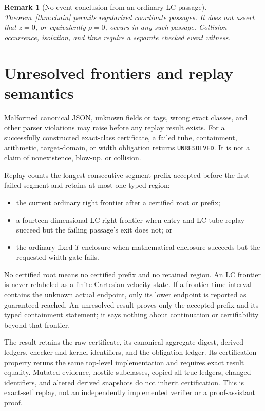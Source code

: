 \documentclass[11pt]{article}
\newtheorem{remark}[theorem]{Remark}
\begin{document}
\begin{remark}[No event conclusion from an ordinary LC passage]
Theorem~\ref{thm:chain} permits regularized coordinate passages.  It does not
assert that $z=0$, or equivalently $\rho=0$, occurs in any such passage.
Collision occurrence, isolation, and time require a separate checked event
witness.
\end{remark}

\section{Unresolved frontiers and replay semantics}
\label{sec:unresolved}

Malformed canonical JSON, unknown fields or tags, wrong exact classes, and
other parser violations may raise before any replay result exists.  For a
successfully constructed exact-class certificate, a failed tube,
containment, arithmetic, target-domain, or width obligation returns
\texttt{UNRESOLVED}.  It is not a claim of nonexistence, blow-up, or collision.

Replay counts the longest consecutive segment prefix accepted before the
first failed segment and retains at most one typed region:
\begin{itemize}
\item the current ordinary right frontier after a certified root or prefix;
\item a fourteen-dimensional LC right frontier when entry and LC-tube replay
      succeed but the failing passage's exit does not; or
\item the ordinary fixed-$T$ enclosure when mathematical enclosure succeeds
      but the requested width gate fails.
\end{itemize}
No certified root means no certified prefix and no retained region.  An LC
frontier is never relabeled as a finite Cartesian velocity state.  If a
frontier time interval contains the unknown actual endpoint, only its lower
endpoint is reported as guaranteed reached.  An unresolved result proves only
the accepted prefix and its typed containment statement; it says nothing
about continuation or certifiability beyond that frontier.

The result retains the raw certificate, its canonical aggregate digest,
derived ledgers, checker and kernel identifiers, and the obligation ledger.
Its certification property reruns the same top-level implementation and
requires exact result equality.  Mutated evidence, hostile subclasses,
copied all-true ledgers, changed identifiers, and altered derived snapshots do
not inherit certification.  This is exact-self replay, not an independently
implemented verifier or a proof-assistant proof.
\end{document}
